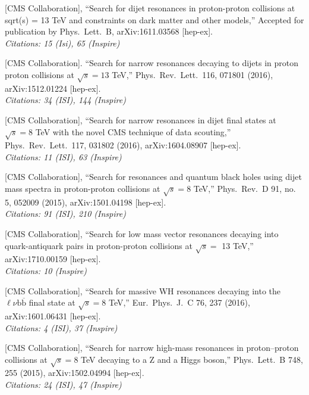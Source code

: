 \documentclass[10pt, a4paper]{article}
\begin{document}
\begin{thebibliography}{599}

  [CMS Collaboration],
  ``Search for dijet resonances in proton-proton collisions at sqrt(s) = 13 TeV and constraints on dark matter and other models,''
  Accepted for publication by Phys.\ Lett.\ B, arXiv:1611.03568
  [hep-ex]. \\
\emph{Citations: 15 (Isi), 65 (Inspire)}

  [CMS Collaboration].
  ``Search for narrow resonances decaying to 
  dijets in proton proton
  collisions at $\sqrt{s}=13$ TeV,''
  Phys.\ Rev.\ Lett.\  116, 071801 (2016), arXiv:1512.01224 [hep-ex]. \\
\emph{Citations: 34 (ISI), 144 (Inspire)}

[CMS Collaboration],
  ``Search for narrow resonances in dijet final states at $\sqrt{s}=8$
  TeV with the novel CMS technique of data scouting,''
  Phys.\ Rev.\ Lett.\  117, 031802 (2016), arXiv:1604.08907 [hep-ex]. \\
\emph{Citations: 11 (ISI), 63 (Inspire)}

  [CMS Collaboration],
  ``Search for resonances and quantum black holes using dijet mass
  spectra in proton-proton collisions at $\sqrt{s}=8$ TeV,''
  Phys.\ Rev.\ D 91, no. 5, 052009 (2015), arXiv:1501.04198 [hep-ex].\\
\emph{Citations: 91 (ISI), 210 (Inspire)}

 [CMS Collaboration],
  ``Search for low mass vector resonances decaying into
  quark-antiquark pairs in proton-proton collisions at $\sqrt{s} = $
  13 TeV,'' arXiv:1710.00159 [hep-ex].\\
\emph{Citations: 10 (Inspire)}

[CMS Collaboration],
  ``Search for massive WH resonances decaying into the $\ell \nu \mathrm{b} \overline{\mathrm{b}} $ final state at $\sqrt{s}=8$ TeV,''
  Eur.\ Phys.\ J.\ C 76, 237 (2016), arXiv:1601.06431 [hep-ex]. \\
\emph{Citations: 4 (ISI), 37 (Inspire)}

 [CMS Collaboration],
  ``Search for narrow high-mass resonances in proton–proton collisions
  at $\sqrt{s}=8$ TeV decaying to a Z and a Higgs boson,''
  Phys.\ Lett.\ B 748, 255 (2015), arXiv:1502.04994 [hep-ex].\\
\emph{Citations: 24 (ISI), 47 (Inspire)}


\end{thebibliography}
\end{document}
